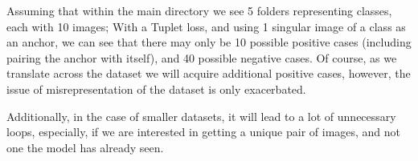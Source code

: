 \documentclass[
	letterpaper, %
	10pt, %
	unnumberedsections, %
	twoside, %
]{LTJournalArticle}
\begin{document}
Assuming that within the main directory we see 5 folders representing classes, each with 10 images; With a Tuplet loss, and using 1 singular image of a class as an anchor, we can see that there may only be 10 possible positive cases (including pairing the anchor with itself), and 40 possible negative cases. Of course, as we translate across the dataset we will acquire additional positive cases, however, the issue of misrepresentation of the dataset is only exacerbated.  %


Additionally, in the case of smaller datasets, it will lead to a lot of unnecessary loops, especially, if we are interested in getting a unique pair of images, and not one the model has already seen.
\end{document}
